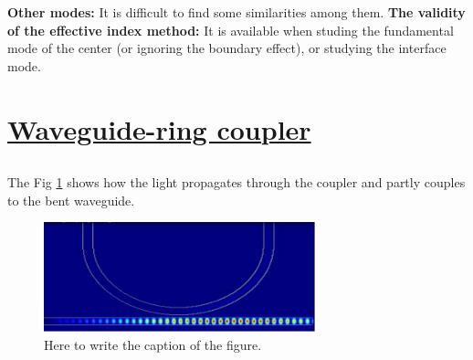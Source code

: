 \documentclass[fontsize=11pt]{scrartcl}
\begin{document}
\textbf{Other modes:} It is difficult to find some similarities among them.
\textbf{The validity of the effective index method:}
It is available when studing the fundamental mode of the center 
(or ignoring the boundary effect), or studying the interface mode.
\pagebreak
\section{\uline{Waveguide-ring coupler}}
\subsection{}
The Fig \ref{fig2.1} shows how the light propagates through the coupler and partly couples 
to the bent waveguide. 
\begin{figure}[H]
    \centering
     \includegraphics[width=0.7\textwidth]{img/fig2.1.png}
     \caption{Here to write the caption of the figure.}
     \label{fig2.1}
\end{figure} 
\end{document}
